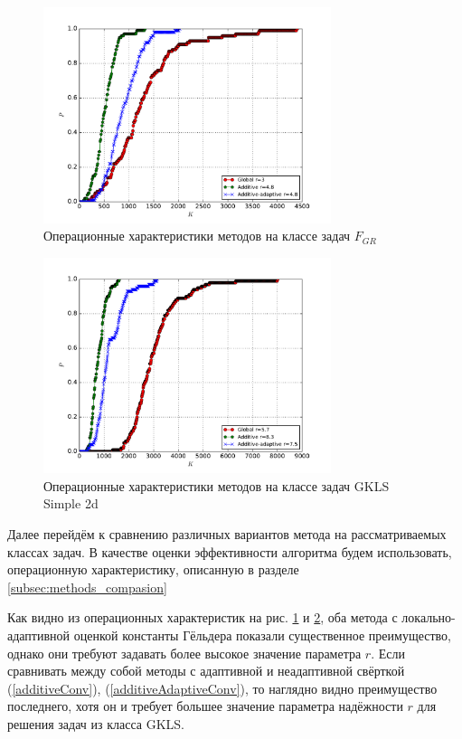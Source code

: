 \begin{figure}[ht]
    \center
    \includegraphics[width=0.75\textwidth]{images/grishagin.pdf}
    \caption{Операционные характеристики методов на классе задач \(F_{GR}\)}
    \label{fig:grishh_op}
\end{figure}

\begin{figure}[H]
  \center
  \includegraphics[width=0.75\textwidth]{images/gkls-s.pdf}
  \caption{Операционные характеристики методов на классе задач GKLS Simple 2d}
  \label{fig:gkls_op}
\end{figure}

Далее перейдём к сравнению различных вариантов метода на рассматриваемых классах задач.
В качестве оценки эффективности алгоритма будем использовать, операционную характеристику,
описанную в разделе \ref{subsec:methods_compasion}

Как видно из операционных характеристик на рис. \ref{fig:grishh_op} и \ref{fig:gkls_op},
оба метода с локально-адаптивной оценкой константы Гёльдера показали существенное преимущество, однако они требуют
задавать более высокое значение параметра \(r\). Если сравнивать между собой методы с
адаптивной и неадаптивной свёрткой (\ref{additiveConv}), (\ref{additiveAdaptiveConv}), то наглядно видно преимущество последнего,
хотя он и требует большее значение параметра надёжности \(r\) для решения задач из класса GKLS.
